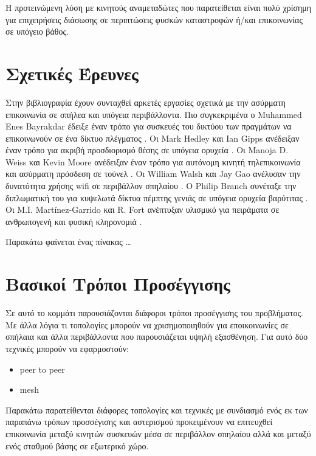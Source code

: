 \documentclass[12pt]{article}
\begin{document}
\begin{multicols*}{2}
        Η προτεινώμενη λύση με κινητούς αναμεταδώτες που παρατείθεται είναι πολύ χρίσημη για επιχειρήσεις διάσωσης σε περιπτώσεις φυσκών καταστροφών ή/και
        επικοινωνίας σε υπόγειο βάθος.

    \section{\normalsize \textsf{Σχετικές Έρευνες}} Στην βιβλιογραφία έχουν συνταχθεί αρκετές εργασίες σχετικά με την ασύρματη επικοινωνία σε σπήλεα και υπόγεια
        περιβάλλοντα. Πιο συγκεκριμένα ο Muhammed Enes Bayrakdar έδειξε έναν τρόπο για συσκευές του δικτύου των πραγμάτων να επικοινωνούν σε ένα δίκτυο
        πλέγματος \cite{bayrakdar_rule_2019}. Οι Mark Hedley και Ian Gipps ανέδειξαν έναν τρόπο για ακριβή προσδιορισμό θέσης σε υπόγεια ορυχεία
        \cite{hedley_accurate_2013}. Οι Manoja D. Weiss και Kevin Moore ανέδειξαν έναν τρόπο για αυτόνομη κινητή τηλεπικοινωνία και ασύρματη πρόσδεση σε τούνελ
        \cite{weiss_autonomous_2009}. Οι William Walsh και Jay Gao ανέλυσαν την δυνατότητα χρήσης wifi σε περιβάλλον σπηλαίου \cite{walsh_communications_2018}.
        Ο Philip Branch συνέταξε την διπλωματική του για κυψελωτά δίκτυα πέμπτης γενιάς σε υπόγεια ορυχεία βαρύτιτας \cite{branch_fifth_2021}. Οι M.I.
        Martínez-Garrido και R. Fort ανέπτυξαν υλισμικό για πειράματα σε ανθρωπογενή και φυσική κληρονομιά \cite{martinez-garrido_experimental_2016}. 

        Παρακάτω φαίνεται ένας πίνακας \dots

    \section{\normalsize \textsf{Βασικοί Τρόποι Προσέγγισης}} Σε αυτό το κομμάτι παρουσιάζονται διάφοροι τρόποι προσέγγισης του προβλήματος. Με άλλα λόγια τι
        τοπολογίες μπορούν να χρισημοποιηθούν για εποικοινωνίες σε σπήλαια και άλλα περιβάλλοντα που παρουσιάζεται υψηλή εξασθένηση. Για αυτό δύο τεχνικές
        μπορούν να εφαρμοστούν:
    \begin{itemize}
        \item peer to peer
        \item mesh
    \end{itemize}

    Παρακάτω παρατείθενται διάφορες τοπολογίες και τεχνικές με συνδιασμό ενός εκ των παραπάνω τρόπων προσσέγισης και αστερισμού προκειμένουν να επιτευχθεί
    επικοινωνία μεταξύ κινητών συσκευών μέσα σε περιβάλλον σπηλαίου αλλά και μεταξύ ενός σταθμού βάσης σε εξωτερικό χώρο.


\end{multicols*}
\end{document}
